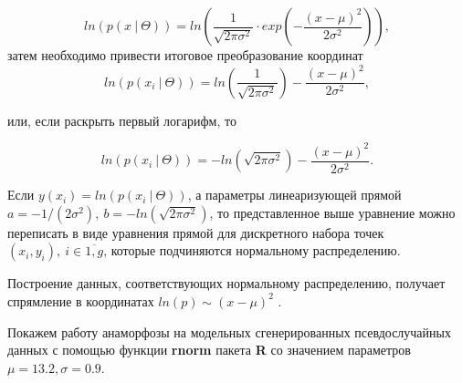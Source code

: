 \documentclass[
  14,
]{article}
\begin{document}
\[
ln(p(x\ |\ \Theta)) = ln\left( \frac{1}{\sqrt{2 \pi \sigma^2}} \cdot exp\left( -\frac{(x - \mu)^2}{2\sigma^2} \right) \right),
\] затем необходимо привести итоговое преобразование координат \[
ln(p(x_i\ |\ \Theta)) = ln\left( \frac{1}{\sqrt{2 \pi \sigma^2}} \right) - \frac{(x - \mu)^2}{2\sigma^2},
\]

или, если раскрыть первый логарифм, то

\[
ln(p(x_i\ |\ \Theta)) = - ln\left(\sqrt{2 \pi \sigma^2} \right) - \frac{(x - \mu)^2}{2\sigma^2}. 
\]

Если \(y(x_i) = ln(p(x_i\ |\ \Theta))\), а параметры линеаризующей
прямой
\(a = - 1/(2\sigma^2), \ b = -ln\left(\sqrt{2 \pi \sigma^2} \right)\),
то представленное выше уравнение можно переписать в виде уравнения
прямой для дискретного набора точек
\((x_i, y_i), \ i \in \overline{1, g}\), которые подчиняются нормальному
распределению.

Построение данных, соответствующих нормальному распределению, получает
спрямление в координатах \(ln(p) \sim (x - \mu)^2\) .

Покажем работу анаморфозы на модельных сгенерированных псевдослучайных
данных с помощью функции \textbf{rnorm} пакета \textbf{R} со значением
параметров \(\mu = 13.2, \sigma = 0.9\).

\(\ \)
\end{document}

